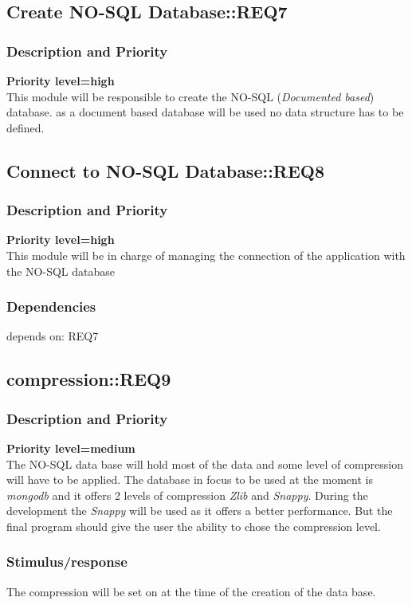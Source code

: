 \documentclass{scrreprt}
\begin{document}
\subsection{Create NO-SQL Database::REQ7}

\subsubsection{Description and Priority}
\textbf{Priority level=high}\\
This module will be responsible to create the NO-SQL (\textit{Documented based}) database.
as a document based database will be used no data structure has to be defined.

\subsection{Connect to NO-SQL Database::REQ8}
\subsubsection{Description and Priority}
\textbf{Priority level=high}\\
This module will be in charge of managing the connection of the application with
the NO-SQL database
\subsubsection{Dependencies}
depends on: REQ7


\subsection{compression::REQ9}
\subsubsection{Description and Priority}
\textbf{Priority level=medium}\\
The NO-SQL data base will hold most of the data and some level of compression
will have to be applied.
The database in focus to be used at the moment is \textit{mongodb} and it offers
2 levels of compression \textit{Zlib} and \textit{Snappy}.
During the development the \textit{Snappy} will be used as it offers a better
performance.
But the final program should give the user the ability to chose the compression
level.
\subsubsection{Stimulus/response}
The compression will be set on at the time of the creation of the data base.
\end{document}
